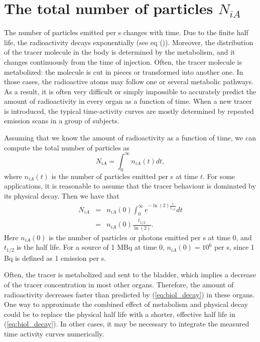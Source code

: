 \section{The total number of particles $N_{iA}$}
The number of particles emitted per s changes with time. Due to the finite
half life, the radioactivity decays exponentially (see eq
()). Moreover, the distribution of the tracer molecule in the
body is determined by the metabolism, and it changes continuously from the
time of injection. Often, the tracer molecule is metabolized: the molecule is
cut in pieces or transformed into another one. In those cases, the radioactive
atoms may follow one or several metabolic pathways. As a result, it is often
very difficult or simply impossible to accurately predict the amount of
radioactivity in every organ as a function of time. When a new tracer is
introduced, the typical time-activity curves are mostly determined by repeated
emission scans in a group of subjects.

Assuming that we know the amount of radioactivity as a function of time, we
can compute the total number of particles as
\begin{equation}
  N_{iA} =  \int_0^{\infty} n_{iA}(t) dt,
\end{equation}
where $n_{iA}(t)$ is the number of particles emitted per s at time $t$.
For some applications, it is reasonable to assume that the tracer behaviour is
dominated by its physical decay. Then we have that
\begin{eqnarray}
  N_{iA} & = & n_{iA}(0) \int_0^{\infty} e^{- \ln(2) \frac{t}{t_{1/2}}} dt \nonumber\\
         & = & n_{iA}(0) \frac{t_{1/2}}{\ln(2)}. \label{eq:biol_decay}
\end{eqnarray}
Here $n_{iA}(0)$ is the number of particles or photons emitted per s at time
0, and $t_{1/2}$ is the half life.
For a source of 1 MBq at time 0, $n_{iA}(0) = 10^6$ per s, since 1 Bq is
defined as 1 emission per s.

Often, the tracer is metabolized and sent to the bladder, which implies a
decrease of the tracer concentration in most other organs. Therefore,
the amount of radioactivity decreases faster than predicted by
(\ref{eq:biol_decay}) in these organs. One way to approximate the combined
effect of metabolism and physical decay could be to replace the physical
half life with a shorter, effective half life in (\ref{eq:biol_decay}).
In other cases, it may
be necessary to integrate the measured time activity curves numerically.

